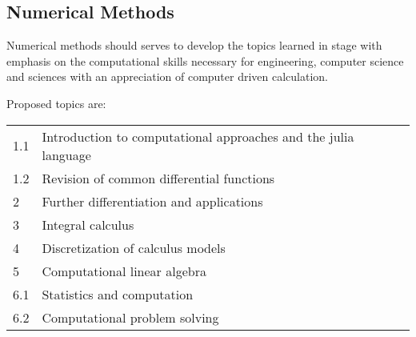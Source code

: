 \documentclass[11pt]{report}
\begin{document}
\subsection{Numerical Methods}
    Numerical methods should serves to develop the topics learned in stage with emphasis on the computational skills necessary for engineering, computer science and sciences with an appreciation of computer driven calculation.

    Proposed topics are:
    \begin{table}[H]
        \centering
        \begin{tabular}{|l|l|}
        \hline
            1.1 & Introduction to computational approaches and the julia language\\
            1.2 & Revision of common differential functions\\ \hline
            2 & Further differentiation and applications \\ \hline
            3 & Integral calculus \\ \hline
            4 & Discretization of calculus models\\ \hline
            5 & Computational linear algebra \\ \hline
            6.1 & Statistics and computation \\ \hline
            6.2 & Computational problem solving \\ \hline
        \end{tabular}
    \end{table}
\end{document}

